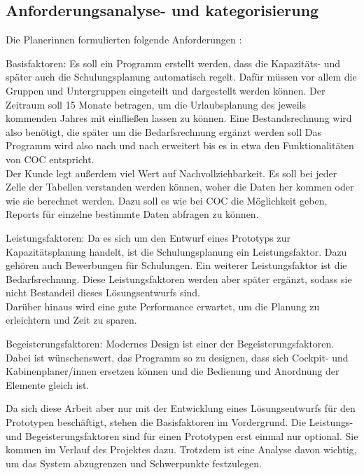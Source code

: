 \documentclass [12pt, a4paper, oneside, titlepage, ngerman]{article}
\begin{document}
\subsection{Anforderungsanalyse- und kategorisierung}
Die Planerinnen formulierten folgende Anforderungen \cite[vgl.]{Gespraech2}:
\begin{description}
\item Basisfaktoren: Es soll ein Programm erstellt werden, dass die Kapazitäts- und später auch die Schulungsplanung automatisch regelt. Dafür müssen vor allem die Gruppen und Untergruppen eingeteilt und dargestellt werden können. Der Zeitraum soll 15 Monate betragen, um die Urlaubsplanung des jeweils kommenden Jahres mit einfließen lassen zu können. Eine Bestandsrechnung wird also benötigt, die später um die Bedarfsrechnung ergänzt werden soll Das Programm wird also nach und nach erweitert bis es in etwa den Funktionalitäten von \ac{COC} entspricht. \\
Der Kunde legt außerdem viel Wert auf Nachvollziehbarkeit. Es soll bei jeder Zelle der Tabellen verstanden werden können, woher die Daten her kommen oder wie sie berechnet werden. Dazu soll es wie bei \ac{COC} die Möglichkeit geben, Reports für einzelne bestimmte Daten abfragen zu können.
\item Leistungsfaktoren: Da es sich um den Entwurf eines Prototyps zur Kapazitätsplanung handelt, ist die Schulungsplanung ein Leistungsfaktor. Dazu gehören auch Bewerbungen für Schulungen. Ein weiterer Leistungsfaktor ist die Bedarfsrechnung. Diese Leistungsfaktoren werden aber später ergänzt, sodass sie nicht Bestandeil dieses Lösungsentwurfs sind. \\
Darüber hinaus wird eine gute Performance erwartet, um die Planung zu erleichtern und Zeit zu sparen.
\item Begeisterungsfaktoren: Modernes Design ist einer der Begeisterungsfaktoren. Dabei ist wünschenswert, das Programm so zu designen, dass sich Cockpit- und Kabinenplaner/innen ersetzen können und die Bedienung und Anordnung der Elemente gleich ist. 
\end{description}
Da sich diese Arbeit aber nur mit der Entwicklung eines Lösungsentwurfs für den Prototypen beschäftigt, stehen die Basisfaktoren im Vordergrund. Die Leistungs- und Begeisterungsfaktoren sind für einen Prototypen erst einmal nur optional. Sie kommen im Verlauf des Projektes dazu. Trotzdem ist eine Analyse davon wichtig, um das System abzugrenzen und Schwerpunkte festzulegen.
\end{document}
